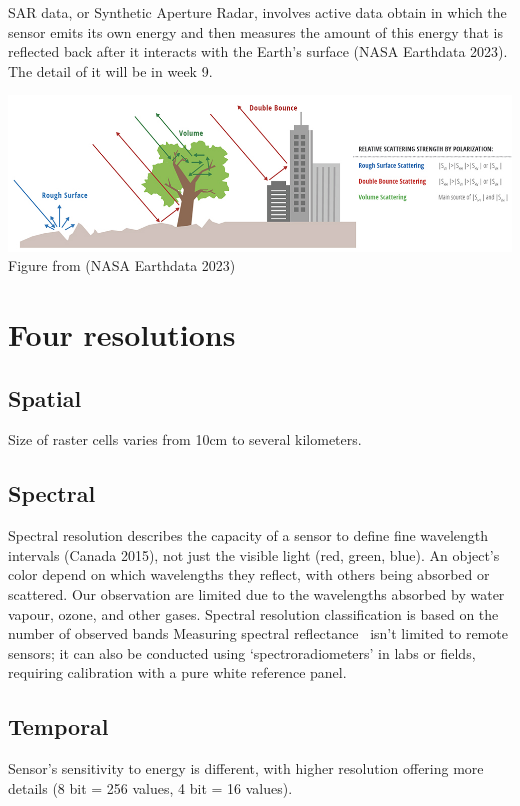 \documentclass[
  letterpaper,
  DIV=11,
  numbers=noendperiod]{scrreprt}
\begin{document}
SAR data, or Synthetic Aperture Radar, involves active data obtain in
which the sensor emits its own energy and then measures the amount of
this energy that is reflected back after it interacts with the Earth's
surface (NASA Earthdata 2023). The detail of it will be in week 9.

\includegraphics{week_1SAR.jpg} Figure from (NASA Earthdata 2023)

\section{Four resolutions}\label{four-resolutions}

\subsection{Spatial}\label{spatial}

Size of raster cells varies from 10cm to several kilometers.

\subsection{Spectral}\label{spectral}

Spectral resolution describes the capacity of a sensor to define fine
wavelength intervals (Canada 2015), not just the visible light (red,
green, blue). An object's color depend on which wavelengths they
reflect, with others being absorbed or scattered. Our observation are
limited due to the wavelengths absorbed by water vapour, ozone, and
other gases. Spectral resolution classification is based on the number
of observed bands Measuring spectral reflectance~ isn't limited to
remote sensors; it can also be conducted using `spectroradiometers' in
labs or fields, requiring calibration with a pure white reference panel.

\subsection{Temporal}\label{temporal}

Sensor's sensitivity to energy is different, with higher resolution
offering more details (8 bit = 256 values, 4 bit = 16 values).
\end{document}
